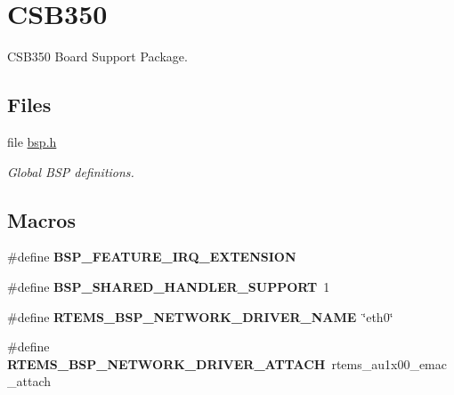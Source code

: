 \hypertarget{group__RTEMSBSPsMIPSCSB350}{}\section{C\+S\+B350}
\label{group__RTEMSBSPsMIPSCSB350}


C\+S\+B350 Board Support Package.  


\subsection*{Files}
\begin{DoxyCompactItemize}
\item 
file \mbox{\hyperlink{bsps_2mips_2csb350_2include_2bsp_8h}{bsp.\+h}}
\begin{DoxyCompactList}\small\item\em Global B\+SP definitions. \end{DoxyCompactList}\end{DoxyCompactItemize}
\subsection*{Macros}
\begin{DoxyCompactItemize}
\item 
\mbox{\label{group__RTEMSBSPsMIPSCSB350_ga5d7d631d3a14b7554160f14eb42f351b}} 
\#define {\bfseries B\+S\+P\+\_\+\+F\+E\+A\+T\+U\+R\+E\+\_\+\+I\+R\+Q\+\_\+\+E\+X\+T\+E\+N\+S\+I\+ON}
\item 
\mbox{\label{group__RTEMSBSPsMIPSCSB350_ga2fe5e739729e5756a04cc73da64cc8ee}} 
\#define {\bfseries B\+S\+P\+\_\+\+S\+H\+A\+R\+E\+D\+\_\+\+H\+A\+N\+D\+L\+E\+R\+\_\+\+S\+U\+P\+P\+O\+RT}~1
\item 
\mbox{\label{group__RTEMSBSPsMIPSCSB350_ga86d4f9aa98431100692e31068070a8df}} 
\#define {\bfseries R\+T\+E\+M\+S\+\_\+\+B\+S\+P\+\_\+\+N\+E\+T\+W\+O\+R\+K\+\_\+\+D\+R\+I\+V\+E\+R\+\_\+\+N\+A\+ME}~\char`\"{}eth0\char`\"{}
\item 
\mbox{\label{group__RTEMSBSPsMIPSCSB350_gadde0d66aef9442971dde465292ac14e6}} 
\#define {\bfseries R\+T\+E\+M\+S\+\_\+\+B\+S\+P\+\_\+\+N\+E\+T\+W\+O\+R\+K\+\_\+\+D\+R\+I\+V\+E\+R\+\_\+\+A\+T\+T\+A\+CH}~rtems\+\_\+au1x00\+\_\+emac\+\_\+attach
\end{DoxyCompactItemize}

